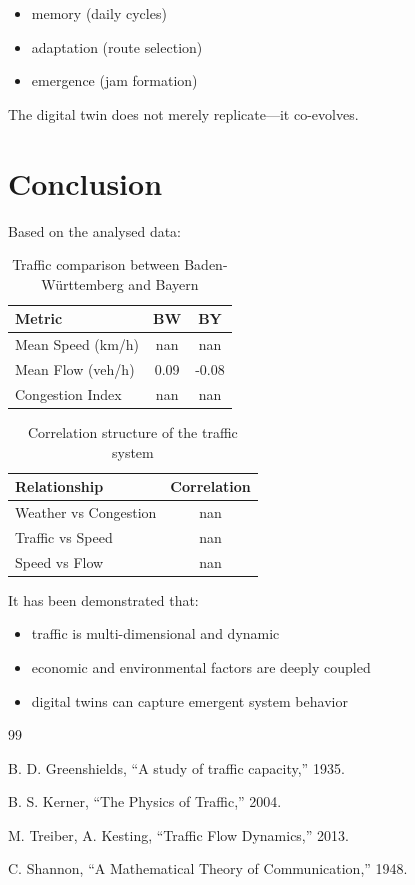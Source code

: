\documentclass[12pt]{article}
\begin{document}
\begin{itemize}
\item memory (daily cycles)
\item adaptation (route selection)
\item emergence (jam formation)
\end{itemize}

The digital twin does not merely replicate—it co-evolves.

\section{Conclusion}
Based on the analysed data:

\begin{table}[H]
\centering
\begin{tabular}{lcc}
\toprule
Metric & BW & BY \\
\midrule
Mean Speed (km/h) & nan & nan \\
Mean Flow (veh/h) & 0.09 & -0.08 \\
Congestion Index & nan & nan \\
\bottomrule
\end{tabular}
\caption{Traffic comparison between Baden-Württemberg and Bayern}
\end{table}


\begin{table}[H]
\centering
\begin{tabular}{lc}
\toprule
Relationship & Correlation \\
\midrule
Weather vs Congestion & nan \\
Traffic vs Speed & nan \\
Speed vs Flow & nan \\
\bottomrule
\end{tabular}
\caption{Correlation structure of the traffic system}
\end{table}


It has been demonstrated that:

\begin{itemize}
\item traffic is multi-dimensional and dynamic
\item economic and environmental factors are deeply coupled
\item digital twins can capture emergent system behavior
\end{itemize}

\begin{thebibliography}{99}

B. D. Greenshields, “A study of traffic capacity,” 1935.

B. S. Kerner, “The Physics of Traffic,” 2004.

M. Treiber, A. Kesting, “Traffic Flow Dynamics,” 2013.

C. Shannon, “A Mathematical Theory of Communication,” 1948.

\end{thebibliography}
\end{document}
